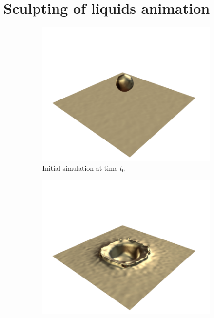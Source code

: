 \chapter{Sculpting of liquids animation}
\label{chap:fluidsculpting}
\begin{figure}[!h]
    \centering
    \begin{subfigure}[b]{0.45\linewidth}
    \centering
    \includegraphics[width=\textwidth]{images/fluidsculpting-mig2016/teaser/fluid_004.png}
    \caption{\label{fig:result_detail:drop_0}\footnotesize{Initial simulation at time $t_0$}}
    \end{subfigure}
    \hspace{0.1cm}
    \begin{subfigure}[b]{0.45\linewidth}
    \includegraphics[width=\textwidth]{images/fluidsculpting-mig2016/teaser/fluid_012.png}

\end{subfigure}
\end{figure}
